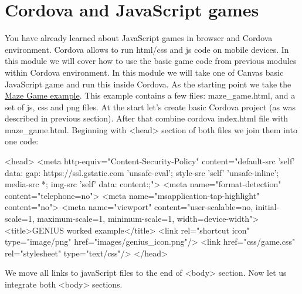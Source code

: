 \chapter{Cordova and JavaScript games}\label{CordovaAndJavaScriptGame}

You have already learned about JavaScript games in browser and Cordova environment. Cordova allows to run html/css and js code on mobile devices. In this module we will cover how to use the basic game code from previous modules within Cordova environment. In this module we will take one of Canvas basic JavaScript game and run this inside Cordova. As the starting point we take the \href{http://geniusgamedev.eu/canvas/canvas/exampleCode/maze_game.html}{Maze Game example}. This example contains a few files: maze\_game.html, and a set of js, css and png files. At the start let's create basic Cordova project (as was described in previous section). After that combine cordova index.html file with maze\_game.html. Beginning with <head> section of both files we join them into one code:

\begin{html}
<head>
        <meta http-equiv="Content-Security-Policy" content="default-src 'self' data: gap: https://ssl.gstatic.com 'unsafe-eval'; style-src 'self' 'unsafe-inline'; media-src *; img-src 'self' data: content:;">
        <meta name="format-detection" content="telephone=no">
        <meta name="msapplication-tap-highlight" content="no">
        <meta name="viewport" content="user-scalable=no, initial-scale=1, maximum-scale=1, minimum-scale=1, width=device-width">
        <title>GENIUS worked example</title>
        <link rel="shortcut icon" type="image/png" href="images/genius_icon.png"/>
        <link href="css/game.css" rel="stylesheet" type="text/css"/>
    </head>
\end{html}

We move all links to javaScript files to the end of <body> section. Now let us integrate both <body> sections.


